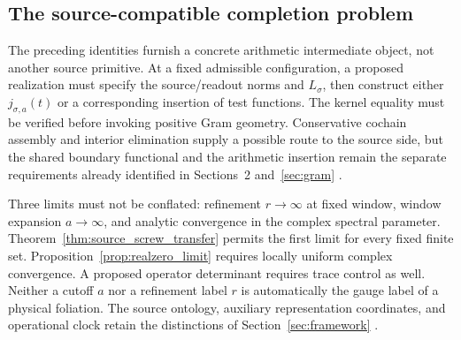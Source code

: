 \documentclass[11pt,letterpaper]{article}
\numberwithin{equation}{section}
\theoremstyle{definition}
\theoremstyle{remark}
\begin{document}
\subsection{The source-compatible completion problem}
\label{subsec:weilsourcestatus}
The preceding identities furnish a concrete arithmetic intermediate object, not another source primitive. At a fixed admissible configuration, a proposed realization must specify the source/readout norms and $L_\sigma$, then construct either $j_{\sigma,a}(t)$ or a corresponding insertion of test functions. The kernel equality must be verified before invoking positive Gram geometry. Conservative cochain assembly and interior elimination supply a possible route to the source side, but the shared boundary functional and the arithmetic insertion remain the separate requirements already identified in Sections~2 and~\ref{sec:gram} \cite{tcgsconservative,tcgsfoam,tcgsoperator}.

Three limits must not be conflated: refinement $r\to\infty$ at fixed window, window expansion $a\to\infty$, and analytic convergence in the complex spectral parameter. Theorem~\ref{thm:source_screw_transfer} permits the first limit for every fixed finite set. Proposition~\ref{prop:realzero_limit} requires locally uniform complex convergence. A proposed operator determinant requires trace control as well. Neither a cutoff $a$ nor a refinement label $r$ is automatically the gauge label of a physical foliation. The source ontology, auxiliary representation coordinates, and operational clock retain the distinctions of Section~\ref{sec:framework} \cite{tcgsfoundation}.
\end{document}
